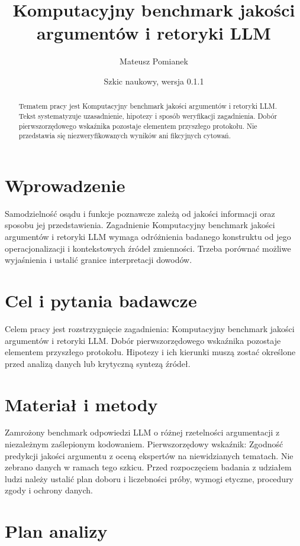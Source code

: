 \documentclass[11pt,a4paper]{article}
\title{Komputacyjny benchmark jakości argumentów i retoryki LLM}
\author{Mateusz Pomianek}
\date{Szkic naukowy, wersja 0.1.1}
\begin{document}
\maketitle

\begin{abstract}

Tematem pracy jest Komputacyjny benchmark jakości argumentów i retoryki LLM. Tekst systematyzuje uzasadnienie, hipotezy i sposób weryfikacji zagadnienia. Dobór pierwszorzędowego wskaźnika pozostaje elementem przyszłego protokołu. Nie przedstawia się niezweryfikowanych wyników ani fikcyjnych cytowań.

\end{abstract}

\section{Wprowadzenie}

Samodzielność osądu i funkcje poznawcze zależą od jakości informacji oraz sposobu jej przedstawienia. Zagadnienie Komputacyjny benchmark jakości argumentów i retoryki LLM wymaga odróżnienia badanego konstruktu od jego operacjonalizacji i kontekstowych źródeł zmienności. Trzeba porównać możliwe wyjaśnienia i ustalić granice interpretacji dowodów.

\section{Cel i pytania badawcze}

Celem pracy jest rozstrzygnięcie zagadnienia: Komputacyjny benchmark jakości argumentów i retoryki LLM. Dobór pierwszorzędowego wskaźnika pozostaje elementem przyszłego protokołu. Hipotezy i ich kierunki muszą zostać określone przed analizą danych lub krytyczną syntezą źródeł.

\section{Materiał i metody}

Zamrożony benchmark odpowiedzi LLM o różnej rzetelności argumentacji z niezależnym zaślepionym kodowaniem. Pierwszorzędowy wskaźnik: Zgodność predykcji jakości argumentu z oceną ekspertów na niewidzianych tematach. Nie zebrano danych w ramach tego szkicu. Przed rozpoczęciem badania z udziałem ludzi należy ustalić plan doboru i liczebności próby, wymogi etyczne, procedury zgody i ochrony danych.

\section{Plan analizy}
\end{document}
